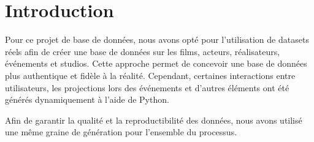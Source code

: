 \section{Introduction}

Pour ce projet de base de données, nous avons opté pour l'utilisation de datasets réels afin de créer une base de données sur les films, acteurs, réalisateurs, événements et studios. Cette approche permet de concevoir une base de données plus authentique et fidèle à la réalité. Cependant, certaines interactions entre utilisateurs, les projections lors des événements et d'autres éléments ont été générés dynamiquement à l'aide de Python.

Afin de garantir la qualité et la reproductibilité des données, nous avons utilisé une même graine de génération pour l'ensemble du processus.